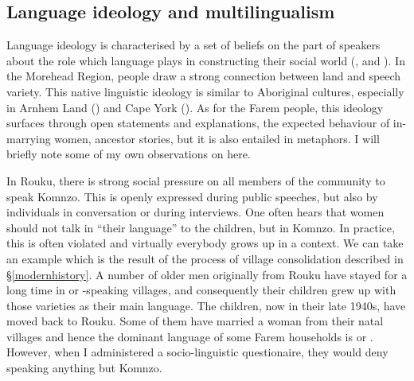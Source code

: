 \subsection{Language ideology and multilingualism}\label{ideomulti}

Language ideology is characterised by a set of beliefs on the part of speakers about the role which language plays in constructing their social world (\citealt{Silverstein:1979li}, \citealt{Rumsey:1990vb} and \citealt{Makihara:2007co}). In the Morehead Region, people draw a strong connection between land and speech variety. This native linguistic ideology is similar to Aboriginal cultures, especially in Arnhem Land (\citealt{Merlan:1981ue}) and Cape York (\citealt{Sutton1978:ws}). As for the Farem people, this ideology surfaces through open statements and explanations, the expected behaviour of in-marrying women, ancestor stories, but it is also entailed in metaphors. I will briefly note some of my own observations on  here.

In Rouku, there is strong social pressure on all members of the community to speak Komnzo. This is openly expressed during public speeches, but also by individuals in conversation or during interviews. One often hears that women should not talk in ``their language'' to the children, but in Komnzo. In practice, this is often violated and virtually everybody grows up in a  context. We can take an example which is the result of the process of village consolidation described in \S\ref{modernhistory}. A number of older men originally from Rouku have stayed for a long time in  or -speaking villages, and consequently their children grew up with those varieties as their main language. The children, now in their late 1940s, have moved back to Rouku. Some of them have married a woman from their natal villages and hence the dominant language of some Farem households is  or . However, when I administered a socio-linguistic questionaire, they would deny speaking anything but Komnzo.


